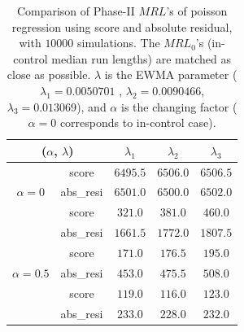 \documentclass[twoside,11pt]{article}
\begin{document}
\begin{table}[!t]
\centering
\begin{tabular}{ccccc}
\toprule
\multicolumn{2}{c}{($ \alpha$, $ \lambda$)} & {$ \lambda_1$} & {$ \lambda_2$} & {$ \lambda_3$} \\
\midrule
\multirow{3}{*}{$\alpha=0$} & score &$6495.5$ & $6506.0$ & $6506.5$ \\
& abs\_resi &$6501.0$ & $6500.0$ & $6502.0$ \\
\midrule
\multirow{3}{*}{$\alpha=0.3$} & score &$\bm{321.0}$ & $\bm{381.0}$ & $\bm{460.0}$ \\
& abs\_resi &$1661.5$ & $1772.0$ & $1807.5$ \\
\midrule
\multirow{3}{*}{$\alpha=0.5$} & score &$\bm{171.0}$ & $\bm{176.5}$ & $\bm{195.0}$ \\
& abs\_resi &$453.0$ & $475.5$ & $508.0$ \\
\midrule
\multirow{3}{*}{$\alpha=0.7$} & score &$\bm{119.0}$ & $\bm{116.0}$ & $\bm{123.0}$ \\
& abs\_resi &$233.0$ & $228.0$ & $232.0$ \\
\midrule
\end{tabular}
\caption{Comparison of Phase-II $MRL$'s of poisson regression using score and absolute residual, with $10000$ simulations. The $MRL_0$'s (in-control median run lengths) are matched as close as possible. $ \lambda$ is the EWMA parameter ({$ \lambda_1=0.0050701$} , {$ \lambda_2=0.0090466$}, {$ \lambda_3=0.013069$}), and $\alpha$ is the changing factor ($ \alpha=0$ corresponds to in-control case).}
\label{tab:pois_MRL}
\end{table}
\end{document}
